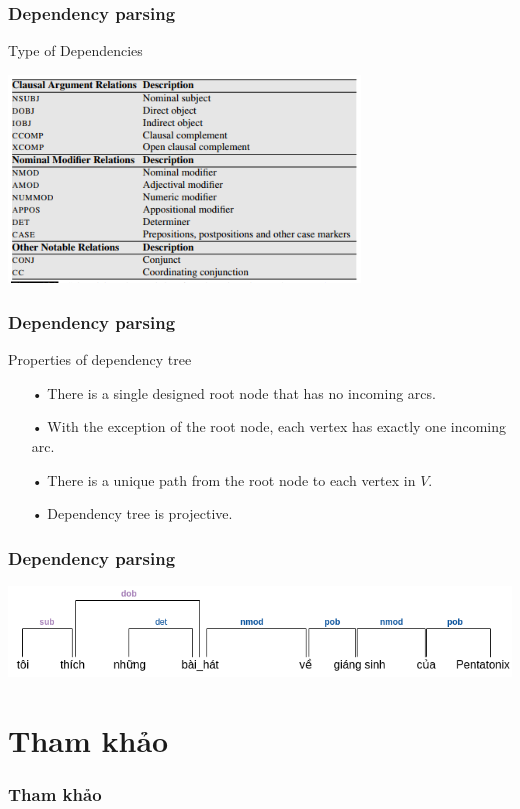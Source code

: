 \documentclass{beamer}
\begin{document}
\begin{frame}
	\frametitle{Dependency parsing}
	
	Type of Dependencies
	\begin{center} 
		\centering 
			\includegraphics[width=0.7\textwidth,height=0.7\textheight,keepaspectratio]{dptypes} 			
			\vspace{0.5cm} 
	\end{center}	
		
\end{frame}

\begin{frame}
	\frametitle{Dependency parsing}
	
	Properties of dependency tree
	\begin{itemize}
		
		\item[•] There is a single designed root node that has no incoming arcs.
		\item[•] With the exception of the root node, each vertex has exactly one incoming arc.
		\item[•] There is a unique path from the root node to each vertex in $V$.
		\item[•] Dependency tree is projective.		
		
	\end{itemize}		
		
\end{frame}

\begin{frame}
	\frametitle{Dependency parsing}
			
	\begin{center} 
		\centering 
			\includegraphics[width=\textwidth,height=\textheight,keepaspectratio]{qa_first_ex} 			
			\vspace{0.5cm} 
	\end{center}		
		
\end{frame}
	
\section{Tham khảo}
\begin{frame}
	\frametitle{Tham khảo}
	\printbibliography
\end{frame}
	
	
	
	
	
	
	
\end{document}
